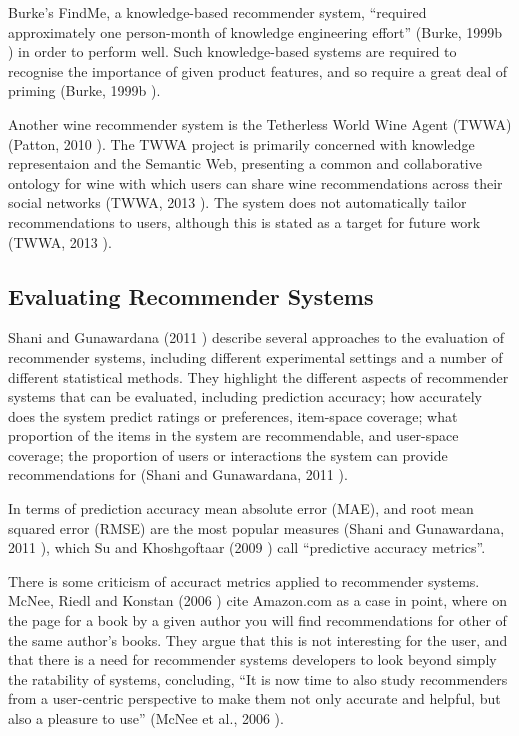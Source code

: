 Burke's FindMe, a knowledge-based recommender system, ``required approximately one person-month of knowledge engineering effort'' (Burke, 1999b \cite{Burke99b}) in order to perform well. Such knowledge-based systems are required to recognise the importance of given product features, and so require a great deal of priming (Burke, 1999b \cite{Burke99b}).

Another wine recommender system is the Tetherless World Wine Agent (TWWA) (Patton, 2010 \cite{Patton10}). The TWWA project is primarily concerned with knowledge representaion and the Semantic Web, presenting a common and collaborative ontology for wine with which users can share wine recommendations across their social networks (TWWA, 2013 \cite{TWWAIndex}). The system does not automatically tailor recommendations to users, although this is stated as a target for future work (TWWA, 2013 \cite{TWWAIndex}).

\subsection{Evaluating Recommender Systems}

Shani and Gunawardana (2011 \cite{Shani11}) describe several approaches to the evaluation of recommender systems, including different experimental settings and a number of different statistical methods. They highlight the different aspects of recommender systems that can be evaluated, including prediction accuracy; how accurately does the system predict ratings or preferences, item-space coverage; what proportion of the items in the system are recommendable, and user-space coverage; the proportion of users or interactions the system can provide recommendations for (Shani and Gunawardana, 2011 \cite{Shani11}).

In terms of prediction accuracy mean absolute error (MAE), and root mean squared error (RMSE) are the most popular measures (Shani and Gunawardana, 2011 \cite{Shani11}), which Su and Khoshgoftaar (2009 \cite{Su09}) call ``predictive accuracy metrics''. 

There is some criticism of accuract metrics applied to recommender systems. McNee, Riedl and Konstan (2006 \cite{McNee06}) cite Amazon.com as a case in point, where on the page for a book by a given author you will find recommendations for other of the same author's books. They argue that this is not interesting for the user, and that there is a need for recommender systems developers to look beyond simply the ratability of systems, concluding, ``It is now time to also study recommenders from a user-centric perspective to make them not only accurate and helpful, but also a pleasure to use'' (McNee et al., 2006 \cite{McNee06}).

